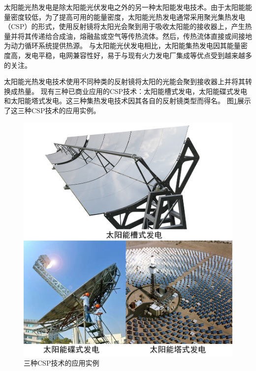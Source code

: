 太阳能光热发电是除太阳能光伏发电之外的另一种太阳能发电技术。由于太阳能能量密度较低，为了提高可用的能量密度，太阳能光热发电通常采用聚光集热发电（CSP）的形式，使用反射镜将太阳光会聚到用于吸收太阳能的接收器上，产生热量并将其传递给合成油，熔融盐或空气等传热流体。然后，传热流体直接或间接地为动力循环系统提供热源。
与太阳能光伏发电相比，太阳能集热发电因其能量密度高，发电平稳，电网兼容性好，易于与现有火力发电厂集成等优点受到越来越多的关注。


太阳能光热发电技术使用不同种类的反射镜将太阳的光能会聚到接收器上并将其转换成热量。
现有三种已商业应用的CSP技术：太阳能槽式发电，太阳能碟式发电和太阳能塔式发电。这三种集热发电技术因其各自的反射镜类型而得名。
图\ref{fig:collectors}展示了这三种CSP技术的应用实例。
\begin{figure}[!ht]
\centering
\includegraphics[width=.8\textwidth]{fig/Collectors}
\caption{三种CSP技术的应用实例}\label{fig:collectors}
\end{figure}

